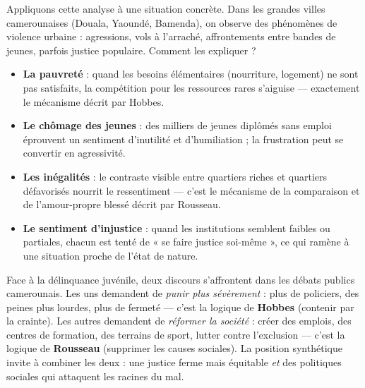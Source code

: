 \documentclass[11pt]{article}
\begin{document}
Appliquons cette analyse à une situation concrète. Dans les grandes villes camerounaises (Douala, Yaoundé, Bamenda), on observe des phénomènes de violence urbaine : agressions, vols à l'arraché, affrontements entre bandes de jeunes, parfois justice populaire. Comment les expliquer ?

\begin{itemize}
\item \textbf{La pauvreté} : quand les besoins élémentaires (nourriture, logement) ne sont pas satisfaits, la compétition pour les ressources rares s'aiguise — exactement le mécanisme décrit par Hobbes.
\item \textbf{Le chômage des jeunes} : des milliers de jeunes diplômés sans emploi éprouvent un sentiment d'inutilité et d'humiliation ; la frustration peut se convertir en agressivité.
\item \textbf{Les inégalités} : le contraste visible entre quartiers riches et quartiers défavorisés nourrit le ressentiment — c'est le mécanisme de la comparaison et de l'amour-propre blessé décrit par Rousseau.
\item \textbf{Le sentiment d'injustice} : quand les institutions semblent faibles ou partiales, chacun est tenté de « se faire justice soi-même », ce qui ramène à une situation proche de l'état de nature.
\end{itemize}

\begin{exemplebox}
Face à la délinquance juvénile, deux discours s'affrontent dans les débats publics camerounais. Les uns demandent de \emph{punir plus sévèrement} : plus de policiers, des peines plus lourdes, plus de fermeté — c'est la logique de \textbf{Hobbes} (contenir par la crainte). Les autres demandent de \emph{réformer la société} : créer des emplois, des centres de formation, des terrains de sport, lutter contre l'exclusion — c'est la logique de \textbf{Rousseau} (supprimer les causes sociales). La position synthétique invite à combiner les deux : une justice ferme mais équitable \emph{et} des politiques sociales qui attaquent les racines du mal.
\end{exemplebox}
\end{document}
